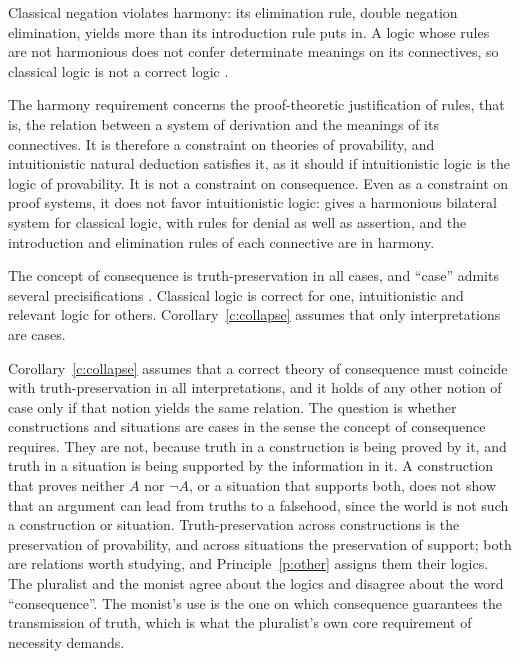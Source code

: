 \documentclass{situationist-preprint}
\begin{document}
\begin{objection}[Harmony]
Classical negation violates harmony: its elimination rule, double negation elimination, yields more than its introduction rule puts in. A logic whose rules are not harmonious does not confer determinate meanings on its connectives, so classical logic is not a correct logic \citep{Dummett1991}.
\end{objection}

\begin{reply}
The harmony requirement concerns the proof-theoretic justification of rules, that is, the relation between a system of derivation and the meanings of its connectives. It is therefore a constraint on theories of provability, and intuitionistic natural deduction satisfies it, as it should if intuitionistic logic is the logic of provability. It is not a constraint on consequence. Even as a constraint on proof systems, it does not favor intuitionistic logic: \citet{Rumfitt2000} gives a harmonious bilateral system for classical logic, with rules for denial as well as assertion, and the introduction and elimination rules of each connective are in harmony.
\end{reply}

\begin{objection}[Pluralism]
The concept of consequence is truth-preservation in all cases, and \enquote{case} admits several precisifications \citep{BeallRestall2006}. Classical logic is correct for one, intuitionistic and relevant logic for others. Corollary~\ref{c:collapse} assumes that only interpretations are cases.
\end{objection}

\begin{reply}
Corollary~\ref{c:collapse} assumes that a correct theory of consequence must coincide with truth-preservation in all interpretations, and it holds of any other notion of case only if that notion yields the same relation. The question is whether constructions and situations are cases in the sense the concept of consequence requires. They are not, because truth in a construction is being proved by it, and truth in a situation is being supported by the information in it. A construction that proves neither $A$ nor $\neg A$, or a situation that supports both, does not show that an argument can lead from truths to a falsehood, since the world is not such a construction or situation. Truth-preservation across constructions is the preservation of provability, and across situations the preservation of support; both are relations worth studying, and Principle~\ref{p:other} assigns them their logics. The pluralist and the monist agree about the logics and disagree about the word \enquote{consequence}. The monist's use is the one on which consequence guarantees the transmission of truth, which is what the pluralist's own core requirement of necessity demands.
\end{reply}
\end{document}
